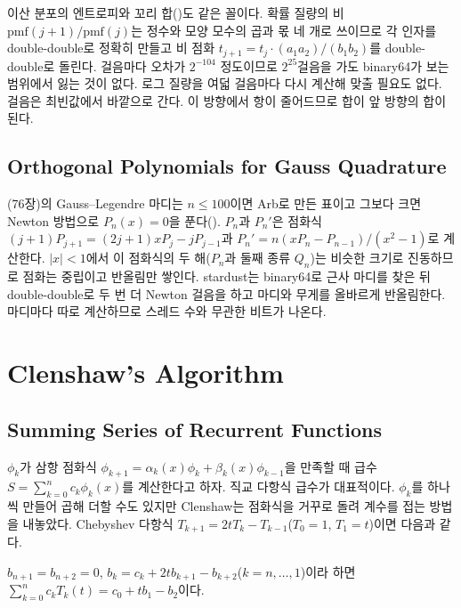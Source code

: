 이산 분포의 엔트로피와 꼬리 합()도 같은 꼴이다. 확률 질량의 비 $\mathrm{pmf}(j+1)/\mathrm{pmf}(j)$는 정수와 모양 모수의 곱과 몫 네 개로 쓰이므로 각 인자를 double-double로 정확히 만들고 비 점화 $t_{j+1}=t_j\cdot(a_1a_2)/(b_1b_2)$를 double-double로 돌린다. 걸음마다 오차가 $2^{-104}$ 정도이므로 $2^{25}$걸음을 가도 binary64가 보는 범위에서 잃는 것이 없다. 로그 질량을 여덟 걸음마다 다시 계산해 맞출 필요도 없다. 걸음은 최빈값에서 바깥으로 간다. 이 방향에서 항이 줄어드므로 합이 앞 방향의 합이 된다.

\subsection{Orthogonal Polynomials for Gauss Quadrature}

(76장)의 Gauss--Legendre 마디는 $n\le100$이면 Arb로 만든 표이고 그보다 크면 Newton 방법으로 $P_n(x)=0$을 푼다(). $P_n$과 $P_n'$은 점화식 $(j+1)P_{j+1}=(2j+1)xP_j-jP_{j-1}$과 $P_n'=n(xP_n-P_{n-1})/(x^2-1)$로 계산한다. $|x|<1$에서 이 점화식의 두 해($P_n$과 둘째 종류 $Q_n$)는 비슷한 크기로 진동하므로 점화는 중립이고 반올림만 쌓인다. stardust는 binary64로 근사 마디를 찾은 뒤 double-double로 두 번 더 Newton 걸음을 하고 마디와 무게를 올바르게 반올림한다. 마디마다 따로 계산하므로 스레드 수와 무관한 비트가 나온다.

\section{Clenshaw's Algorithm}
\label{sec:clenshaw}

\subsection{Summing Series of Recurrent Functions}

$\phi_k$가 삼항 점화식 $\phi_{k+1}=\alpha_k(x)\phi_k+\beta_k(x)\phi_{k-1}$을 만족할 때 급수 $S=\sum_{k=0}^nc_k\phi_k(x)$를 계산한다고 하자. 직교 다항식 급수가 대표적이다. $\phi_k$를 하나씩 만들어 곱해 더할 수도 있지만 Clenshaw\cite{clenshaw1955}는 점화식을 거꾸로 돌려 계수를 접는 방법을 내놓았다. Chebyshev 다항식 $T_{k+1}=2tT_k-T_{k-1}$($T_0=1$, $T_1=t$)이면 다음과 같다.

\begin{proposition}
\label{prop:clenshaw}
$b_{n+1}=b_{n+2}=0$, $b_k=c_k+2tb_{k+1}-b_{k+2}$($k=n,\dots,1$)이라 하면 $\sum_{k=0}^nc_kT_k(t)=c_0+tb_1-b_2$이다.
\end{proposition}

